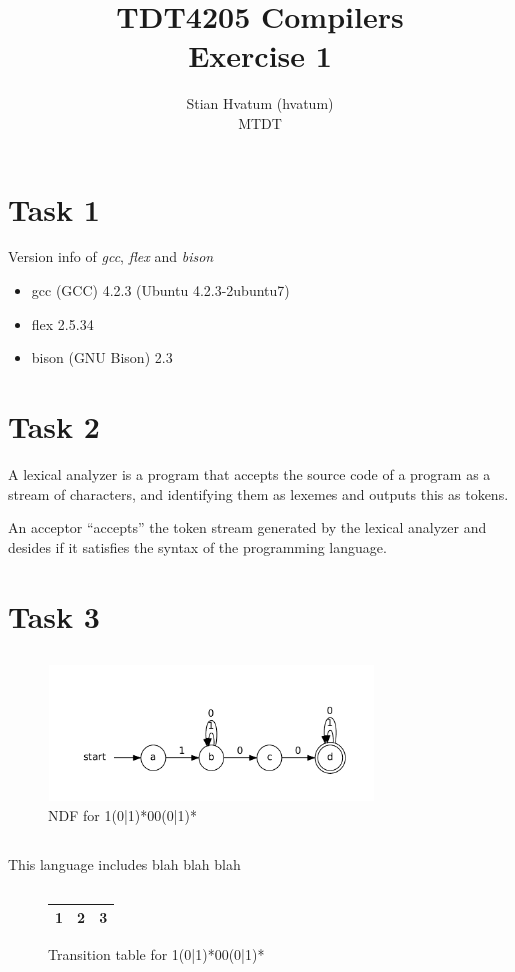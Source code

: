 \documentclass{article}
\title{TDT4205 Compilers\\
\Huge Exercise 1}
\author{Stian Hvatum (hvatum)\\MTDT}
\begin{document}
\maketitle

\section{Task 1}
Version info of \emph{gcc}, \emph{flex} and \emph{bison}
\begin{itemize}
  \item gcc (GCC) 4.2.3 (Ubuntu 4.2.3-2ubuntu7)
  \item flex 2.5.34
  \item bison (GNU Bison) 2.3
\end{itemize}


\section{Task 2}
A lexical analyzer is a program that accepts the source code of a program as a
stream of characters, and identifying them as lexemes and outputs this as
tokens.

An acceptor ``accepts'' the token stream generated by the lexical analyzer
and desides if it satisfies the syntax of the programming language.
\newpage
\section{Task 3}
\subsection{}
\begin{figure}[h]
\includegraphics[width=327px, height=136px]{NDF.pdf}
\caption{NDF for 1(0|1)*00(0|1)*}
\end{figure}

\subsection{}
This language includes blah blah blah

\subsection{}
\begin{figure}[h]
\begin{tabular}{|l|c|r|}
\hline
1 & 2 & 3 \\
\hline
\end{tabular}
\caption{Transition table for 1(0|1)*00(0|1)*}
\end{figure}
\end{document}
